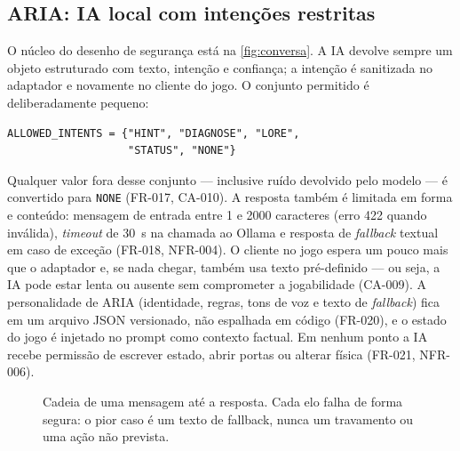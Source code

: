 \subsection{ARIA: IA local com intenções restritas}

O núcleo do desenho de segurança está na \autoref{fig:conversa}. A IA devolve
sempre um objeto estruturado com texto, intenção e confiança; a intenção é
sanitizada no adaptador e novamente no cliente do jogo. O conjunto permitido é
deliberadamente pequeno:

\begin{verbatim}
ALLOWED_INTENTS = {"HINT", "DIAGNOSE", "LORE",
                   "STATUS", "NONE"}
\end{verbatim}

Qualquer valor fora desse conjunto --- inclusive ruído devolvido pelo modelo
--- é convertido para \texttt{NONE} (FR-017, CA-010). A resposta também é
limitada em forma e conteúdo: mensagem de entrada entre 1 e 2000 caracteres
(erro 422 quando inválida), \emph{timeout} de 30~s na chamada ao Ollama e
resposta de \emph{fallback} textual em caso de exceção (FR-018, NFR-004). O
cliente no jogo espera um pouco mais que o adaptador e, se nada chegar,
também usa texto pré-definido --- ou seja, a IA pode estar lenta ou ausente sem
comprometer a jogabilidade (CA-009). A personalidade de ARIA (identidade,
regras, tons de voz e texto de \emph{fallback}) fica em um arquivo JSON
versionado, não espalhada em código (FR-020), e o estado do jogo é injetado no
prompt como contexto factual. Em nenhum ponto a IA recebe permissão de escrever
estado, abrir portas ou alterar física (FR-021, NFR-006).

\begin{figure}[H]
\centering
{}
\caption{Cadeia de uma mensagem até a resposta. Cada elo falha de forma segura: o pior caso é um texto de fallback, nunca um travamento ou uma ação não prevista.}
\label{fig:conversa}
\end{figure}

